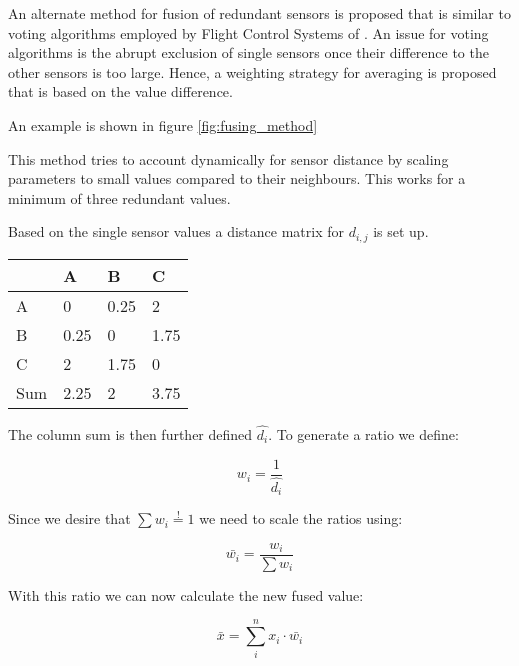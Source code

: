 An alternate method for fusion of redundant sensors is proposed that is similar to voting algorithms employed by Flight Control Systems of \cite{tischler_advances_2018}. An issue for voting algorithms is the abrupt exclusion of single sensors once their difference to the other sensors is too large. Hence, a weighting strategy for averaging is proposed that is based on the value difference.

An example is shown in figure \ref{fig:fusing_method}

This method tries to account dynamically for sensor distance by scaling parameters to small values compared to their neighbours. This works for a minimum of three redundant values.

Based on the single sensor values a distance matrix for $d_{i,j}$ is set up.

\begin{table}[]
    \begin{tabular}{@{}llll@{}}
        \toprule
        & A    & B    & C    \\ \midrule
        \multicolumn{1}{l|}{A}   & 0    & 0.25 & 2    \\
        \multicolumn{1}{l|}{B}   & 0.25 & 0    & 1.75 \\
        \multicolumn{1}{l|}{C}   & 2    & 1.75 & 0    \\ \midrule
        \multicolumn{1}{l|}{Sum} & 2.25 & 2    & 3.75 \\ \bottomrule
    \end{tabular}
\end{table}

The column sum is then further defined $\hat{d_{i}}$. To generate a ratio we define:

\begin{equation}
    w_i=\frac{1}{\hat{d_i}}
    \label{eq:fusing_weight}
\end{equation}

Since we desire that
$\sum{w_i}\overset{!}{=}1$ we need to scale the ratios using:

\begin{equation}
    \bar{w_{i}} = \frac{w_i}{\sum{w_i}}
\end{equation}


With this ratio we can now calculate the new fused value:

\begin{equation}
    \bar{x} = \sum_{i}^{n} x_i \cdot \bar{w_{i}}
\end{equation}

